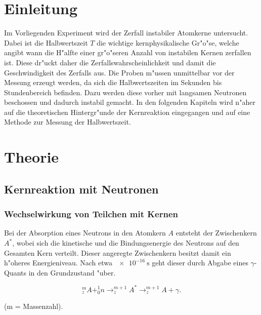 \section{Einleitung}
	\label{sec:einleitung}

	Im Vorliegenden Experiment wird der Zerfall instabiler Atomkerne untersucht.
	Dabei ist die Halbwertszeit $T$ die wichtige kernphysikalische Gr"o"se, welche angibt wann die H"alfte einer gr"o"seren Anzahl von instabilen Kernen zerfallen ist.
	Diese dr"uckt daher die Zerfallswahrscheinlichkeit und damit die Geschwindigkeit des Zerfalls aus.
	Die Proben m"ussen unmittelbar vor der Messung erzeugt werden, da sich die Halbwertszeiten im Sekunden bis Stundenbereich befinden.
	Dazu werden diese vorher mit langsamen Neu\-tro\-nen beschossen und dadurch instabil gemacht.
	In den folgenden Kapiteln wird n"aher auf die theoretischen Hintergr"unde der Kernreaktion eingegangen und auf eine Methode zur Messung der Halbwertszeit.

\section{Theorie}
\label{sec:theorie}

	\subsection{Kernreaktion mit Neutronen}
	\label{sub:kernreaktion_mit_neutronen}

		\subsubsection{Wechselwirkung von Teilchen mit Kernen}
		\label{sub:wechselwirkung_von_teilchen_mit_kernen}
			
			Bei der Absorption eines Neutrons in den Atomkern $A$ entsteht der Zwischenkern $A^*$, wobei sich die kinetische und die Bindungsenergie des Neutrons auf den Gesamten Kern verteilt.
			Dieser angeregte Zwischenkern besitzt damit ein h"oheres Energieniveau.
			Nach etwa $\SI{e-16}{\second}$ geht dieser durch Abgabe eines $\gamma$-Quants in den Grundzustand "uber.

			\begin{equation*}
				^m_zA + ^1_0n \rightarrow ^{m+1}_zA^* \rightarrow ^{m+1}_zA + \gamma.
			\end{equation*}

			\begin{center}
				\tiny{(m = Massenzahl).}
			\end{center}

